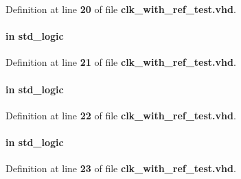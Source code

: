 Definition at line {\bf 20} of file {\bf clk\+\_\+with\+\_\+ref\+\_\+test.\+vhd}.

\paragraph[{clk1}]{ {\bfseries \textcolor{keywordflow}{in}\textcolor{vhdlchar}{ }} {\bfseries \textcolor{comment}{std\+\_\+logic}\textcolor{vhdlchar}{ }} \hspace{0.3cm}{\ttfamily [Port]}}\label{classclk__with__ref__test_ad8b4adc598629215731e29a823612f50}


Definition at line {\bf 21} of file {\bf clk\+\_\+with\+\_\+ref\+\_\+test.\+vhd}.

\paragraph[{clk2}]{ {\bfseries \textcolor{keywordflow}{in}\textcolor{vhdlchar}{ }} {\bfseries \textcolor{comment}{std\+\_\+logic}\textcolor{vhdlchar}{ }} \hspace{0.3cm}{\ttfamily [Port]}}\label{classclk__with__ref__test_afcf7e729136627e3c24358022d47ddc9}


Definition at line {\bf 22} of file {\bf clk\+\_\+with\+\_\+ref\+\_\+test.\+vhd}.

\paragraph[{clk3}]{ {\bfseries \textcolor{keywordflow}{in}\textcolor{vhdlchar}{ }} {\bfseries \textcolor{comment}{std\+\_\+logic}\textcolor{vhdlchar}{ }} \hspace{0.3cm}{\ttfamily [Port]}}\label{classclk__with__ref__test_a6a1c58aabbd7ceb67578f4b2524c9dfe}


Definition at line {\bf 23} of file {\bf clk\+\_\+with\+\_\+ref\+\_\+test.\+vhd}.

